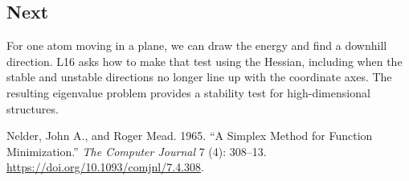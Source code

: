\documentclass[
  11pt,
  letterpaper,
  DIV=11,
  numbers=noendperiod]{scrartcl}
\newlength{\cslhangindent}
\newenvironment{CSLReferences}[2] %
 {\begin{list}{}{%
  \setlength{\itemindent}{0pt}
  \setlength{\leftmargin}{0pt}
  \setlength{\parsep}{0pt}
  \ifodd #1
   \setlength{\leftmargin}{\cslhangindent}
   \setlength{\itemindent}{-1\cslhangindent}
  \fi
  \setlength{\itemsep}{#2\baselineskip}}}
 {\end{list}}
\begin{document}
\subsection{Next}\label{next}

For one atom moving in a plane, we can draw the energy and find a
downhill direction. L16 asks how to make that test using the Hessian,
including when the stable and unstable directions no longer line up with
the coordinate axes. The resulting eigenvalue problem provides a
stability test for high-dimensional structures.

\protect{}\label{refs}
\begin{CSLReferences}{1}{1}
Nelder, John A., and Roger Mead. 1965. {``A Simplex Method for Function
Minimization.''} \emph{The Computer Journal} 7 (4): 308--13.
\url{https://doi.org/10.1093/comjnl/7.4.308}.

\end{CSLReferences}
\end{document}
